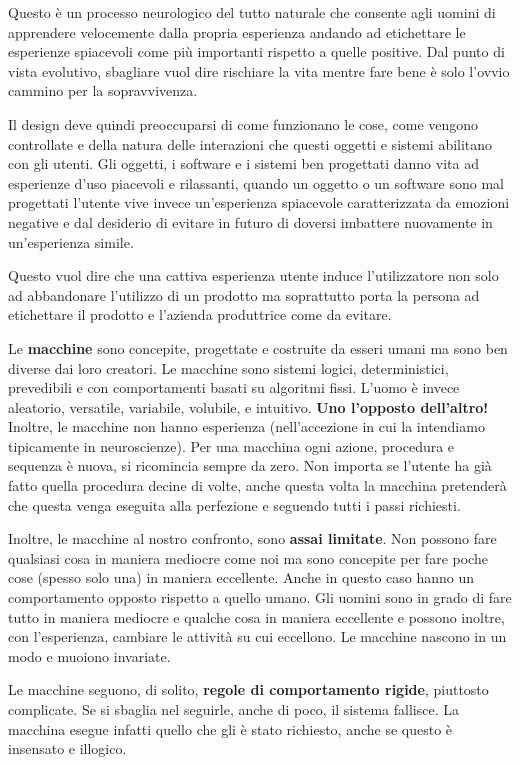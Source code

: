 Questo è un processo neurologico del tutto naturale che consente agli uomini di apprendere velocemente dalla propria esperienza andando ad etichettare le esperienze spiacevoli come più importanti rispetto a quelle positive. Dal punto di vista evolutivo, sbagliare vuol dire rischiare la vita mentre fare bene è solo l'ovvio cammino per la sopravvivenza.

Il design deve quindi preoccuparsi di come funzionano le cose, come vengono controllate e della natura delle interazioni che questi oggetti e sistemi abilitano con gli utenti. Gli oggetti, i software e i sistemi ben progettati danno vita ad esperienze d'uso piacevoli e rilassanti, quando un oggetto o un software sono mal progettati l'utente vive invece un'esperienza spiacevole caratterizzata da emozioni negative e dal desiderio di evitare in futuro di doversi imbattere nuovamente in un'esperienza simile.

Questo vuol dire che una cattiva esperienza utente induce l'utilizzatore non solo ad abbandonare l'utilizzo di un prodotto ma soprattutto porta la persona ad etichettare il prodotto e l'azienda produttrice come da evitare. 

Le \textbf{macchine} sono concepite, progettate e costruite da esseri umani ma sono ben diverse dai loro creatori. Le macchine sono sistemi logici, deterministici, prevedibili e con comportamenti basati su algoritmi fissi. L'uomo è invece aleatorio, versatile, variabile, volubile, e intuitivo. \textbf{Uno l'opposto dell'altro!}
Inoltre, le macchine non hanno esperienza (nell'accezione in cui la intendiamo tipicamente in neuroscienze). Per una macchina ogni azione, procedura e sequenza è nuova, si ricomincia sempre da zero. Non importa se l'utente ha già fatto quella procedura decine di volte, anche questa volta la macchina pretenderà che questa venga eseguita alla perfezione e seguendo tutti i passi richiesti.

Inoltre, le macchine al nostro confronto, sono \textbf{assai limitate}. Non possono fare qualsiasi cosa in maniera mediocre come noi ma sono concepite per fare poche cose (spesso solo una) in maniera eccellente. Anche in questo caso hanno un comportamento opposto rispetto a quello umano. Gli uomini sono in grado di fare tutto in maniera mediocre e qualche cosa in maniera eccellente e possono inoltre, con l'esperienza, cambiare le attività su cui eccellono. Le macchine nascono in un modo e muoiono invariate.

Le macchine seguono, di solito, \textbf{regole di comportamento rigide}, piuttosto complicate. Se si sbaglia nel seguirle, anche di poco, il sistema fallisce. La macchina esegue infatti quello che gli è stato richiesto, anche se questo è insensato e illogico. 

